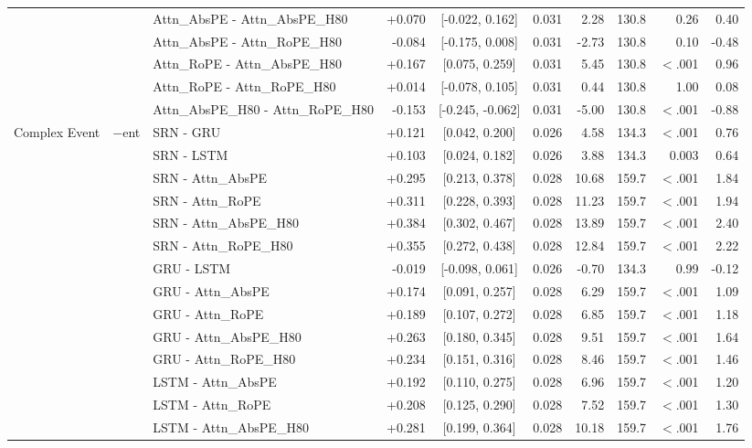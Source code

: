 \begin{longtable}{@{}lllrcrrrrr@{}}
 &  & Attn\_AbsPE - Attn\_AbsPE\_H80 & +0.070 & [-0.022, 0.162] & 0.031 & 2.28 & 130.8 & 0.26 & 0.40 \\
 &  & Attn\_AbsPE - Attn\_RoPE\_H80 & -0.084 & [-0.175, 0.008] & 0.031 & -2.73 & 130.8 & 0.10 & -0.48 \\
 &  & Attn\_RoPE - Attn\_AbsPE\_H80 & +0.167 & [0.075, 0.259] & 0.031 & 5.45 & 130.8 & $<$.001 & 0.96 \\
 &  & Attn\_RoPE - Attn\_RoPE\_H80 & +0.014 & [-0.078, 0.105] & 0.031 & 0.44 & 130.8 & 1.00 & 0.08 \\
 &  & Attn\_AbsPE\_H80 - Attn\_RoPE\_H80 & -0.153 & [-0.245, -0.062] & 0.031 & -5.00 & 130.8 & $<$.001 & -0.88 \\
\addlinespace[2pt]
\addlinespace
Complex Event & $-$ent & SRN - GRU & +0.121 & [0.042, 0.200] & 0.026 & 4.58 & 134.3 & $<$.001 & 0.76 \\
 &  & SRN - LSTM & +0.103 & [0.024, 0.182] & 0.026 & 3.88 & 134.3 & 0.003 & 0.64 \\
 &  & SRN - Attn\_AbsPE & +0.295 & [0.213, 0.378] & 0.028 & 10.68 & 159.7 & $<$.001 & 1.84 \\
 &  & SRN - Attn\_RoPE & +0.311 & [0.228, 0.393] & 0.028 & 11.23 & 159.7 & $<$.001 & 1.94 \\
 &  & SRN - Attn\_AbsPE\_H80 & +0.384 & [0.302, 0.467] & 0.028 & 13.89 & 159.7 & $<$.001 & 2.40 \\
 &  & SRN - Attn\_RoPE\_H80 & +0.355 & [0.272, 0.438] & 0.028 & 12.84 & 159.7 & $<$.001 & 2.22 \\
 &  & GRU - LSTM & -0.019 & [-0.098, 0.061] & 0.026 & -0.70 & 134.3 & 0.99 & -0.12 \\
 &  & GRU - Attn\_AbsPE & +0.174 & [0.091, 0.257] & 0.028 & 6.29 & 159.7 & $<$.001 & 1.09 \\
 &  & GRU - Attn\_RoPE & +0.189 & [0.107, 0.272] & 0.028 & 6.85 & 159.7 & $<$.001 & 1.18 \\
 &  & GRU - Attn\_AbsPE\_H80 & +0.263 & [0.180, 0.345] & 0.028 & 9.51 & 159.7 & $<$.001 & 1.64 \\
 &  & GRU - Attn\_RoPE\_H80 & +0.234 & [0.151, 0.316] & 0.028 & 8.46 & 159.7 & $<$.001 & 1.46 \\
 &  & LSTM - Attn\_AbsPE & +0.192 & [0.110, 0.275] & 0.028 & 6.96 & 159.7 & $<$.001 & 1.20 \\
 &  & LSTM - Attn\_RoPE & +0.208 & [0.125, 0.290] & 0.028 & 7.52 & 159.7 & $<$.001 & 1.30 \\
 &  & LSTM - Attn\_AbsPE\_H80 & +0.281 & [0.199, 0.364] & 0.028 & 10.18 & 159.7 & $<$.001 & 1.76 \\

\end{longtable}
